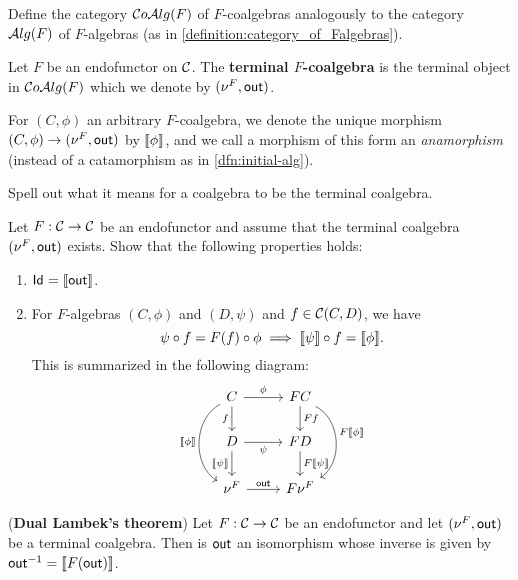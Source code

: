 \begin{exer} Define the category $\mathcal{C}o\mathcal{A}lg(F)$ of $F$-coalgebras analogously to the category $\mathcal{A}lg(F)$ of $F$-algebras (as in \cref{definition:category_of_Falgebras}).
\end{exer}

\begin{dfn} Let $F$ be an endofunctor on $\mathcal{C}$. The \textbf{terminal $F$-coalgebra} is the terminal object in $\mathcal{C}o\mathcal{A}lg(F)$ which we denote by $(\nu^{F}, \mathsf{out})$.
  
For $(C,\phi)$ an arbitrary $F$-coalgebra, we denote the unique morphism $(C,\phi) \to (\nu^{F}, \mathsf{out})$ by $\llbracket \phi \rrbracket$, and we call a morphism of this form an \textit{anamorphism} (instead of a catamorphism as in \cref{dfn:initial-alg}).
\end{dfn}

\begin{exer} Spell out what it means for a coalgebra to be the terminal coalgebra.
\end{exer}

\begin{exer} Let $F:\mathcal{C}\to\mathcal{C}$ be an endofunctor and assume that the terminal coalgebra $(\nu^{F}, \mathsf{out})$ exists. Show that the following properties holds:
\begin{enumerate}
\item $\mathsf{Id}_{} = \llbracket \mathsf{out} \rrbracket$.
\item For $F$-algebras $(C,\phi)$ and $(D,\psi)$ and $f\in{\mathcal{C}}(C,D)$, we have 
\[
  \psi \circ f   = F(f) \circ \phi \implies \llbracket \psi \rrbracket \circ f = \llbracket \phi \rrbracket.
\]
This is summarized in the following diagram:
\[
\begin{tikzcd}
C 
\arrow[r, "\phi"] 
\arrow[d,swap, "f"]
\ar[dd, "\anam{\phi}"', bend right = 60]
&
FC
\arrow[d, "Ff"]
\ar[dd, "F\anam{\phi}", bend left = 60]
\\
D
\arrow[r, swap, "\psi"]
\ar[d, "\anam{\psi}"']
&
FD
\ar[d, "F\anam{\psi}"]
\\
\Terminalcoalg{F}
\ar[r, "\Out"]
&
F\Terminalcoalg{F}
\end{tikzcd}
\]
\end{enumerate} 
\end{exer}

\begin{exer} (\textbf{Dual Lambek's theorem}) Let $F:\mathcal{C}\to\mathcal{C}$ be an endofunctor and let $(\nu^{F}, \mathsf{out})$ be a terminal coalgebra. Then is $\mathsf{out}$ an isomorphism whose inverse is given by $\mathsf{out} ^{-1} = \llbracket F(\mathsf{out}) \rrbracket$.
\end{exer}

